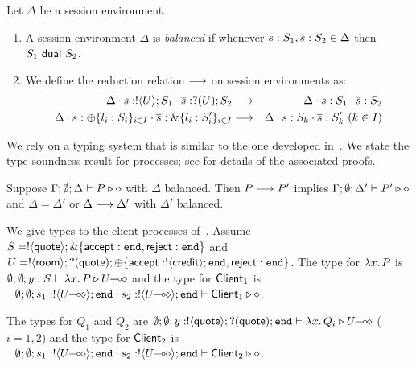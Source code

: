 \documentclass[a4paper,UKenglish]{lipics}
\theoremstyle{definition}
\begin{document}

\begin{definition}\label{d:wtenvred}%
	Let $\Delta$ be a session environment.
	\begin{enumerate}[$\bullet$]
	\item A session environment $\Delta$ is {\em balanced} if whenever
	$s: S_1, \overline{s}: S_2 \in \Delta$ then $S_1 \ \mathsf{dual}\  S_2$.
	\item We define the reduction relation $\longrightarrow$ on session environments as: %
\begin{eqnarray*}
	\Delta \cat s: \btout{U} S_1 \cat \dual{s}: \btinp{U} S_2  & \red & 
	\Delta \cat s: S_1 \cat \dual{s}: S_2  \\
	\Delta \cat s: \btsel{l_i: S_i}_{i \in I} \cat \dual{s}: \btbra{l_i: S_i'}_{i \in I} &\red& \Delta \cat s: S_k \cat \dual{s}: S_k' \ (k \in I)
\end{eqnarray*}
\end{enumerate}
\end{definition}

\noi We rely on a typing system that is similar to the one developed in~\cite{tlca07,MostrousY15}. 
We state the type soundness result for \HOp processes;
see  for details of the associated proofs.


\begin{theorem}\label{t:sr}%
			Suppose $\Gamma; \emptyset; \Delta \vdash P \triangleright \diamond$
			with
			$\Delta$ balanced. 
			Then $P \longrightarrow P'$ implies $\Gamma; \emptyset; \Delta'  \vdash P' \triangleright \diamond$
			and $\Delta = \Delta'$ or $\Delta \longrightarrow \Delta'$
			with $\Delta'$ balanced. 
\end{theorem}


\begin{example}\label{exam:type}
We give types to the client
processes of~.
Assume $S = ! \langle \mathsf{quote} \rangle ; \& \{\mathsf{accept}: \mathtt{end}, \mathsf{reject}: \mathtt{end}\}$ and
$U = ! \langle \mathsf{room} \rangle ; ? (\mathsf{quote}) ; \oplus \{\mathsf{accept}: ! \langle \mathsf{credit} \rangle ; \mathtt{end}, \mathsf{reject}: \mathtt{end} \}$.
The type for $\lambda x.\,P$ is $\emptyset; \emptyset; y: S \vdash \lambda x.\,P \triangleright U\!\! \multimap\!\! \diamond$
and the type for $\mathsf{Client}_1$ is
$~~
	\es; \es; s_1: \btout{\lhot{U}} \tinact \cat s_2: \btout{\lhot{U}} \tinact \proves \Client_1 \hastype \Proc
$.


The types for $Q_1$ and $Q_2$ are
$	\emptyset; \emptyset; y: ! \langle \mathsf{quote} \rangle ; ? (\mathsf{quote}) ; \mathtt{end} \vdash \lambda x.\,Q_i \triangleright U\!\! \multimap\!\! \diamond
$ ($i=1,2$)
and the type for $\mathsf{Client}_2$ is
$~~
	\es; \es; s_1: \btout{\lhot{U}} \tinact \cat s_2: \btout{\lhot{U}} \tinact \proves \Client_2 \hastype \Proc
$.
\end{example}
\end{document}
